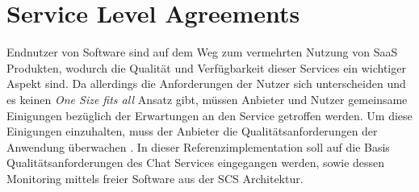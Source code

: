 \chapter{Service Level Agreements}
\label{chapter:sla}
Endnutzer von Software sind auf dem Weg zum vermehrten Nutzung von \ac{SaaS} Produkten, wodurch
die Qualität und Verfügbarkeit dieser Services ein wichtiger Aspekt sind. Da allerdings die 
Anforderungen der Nutzer sich unterscheiden und es keinen \emph{One Size fits all} Ansatz gibt,
müssen Anbieter und Nutzer gemeinsame Einigungen bezüglich der Erwartungen an den Service getroffen werden.
Um diese Einigungen einzuhalten, muss der Anbieter die Qualitätsanforderungen der Anwendung überwachen \cite{Patel2009}.
In dieser Referenzimplementation soll auf die Basis Qualitätsanforderungen des Chat Services eingegangen werden,
sowie dessen Monitoring mittels freier Software aus der \ac{SCS} Architektur. 